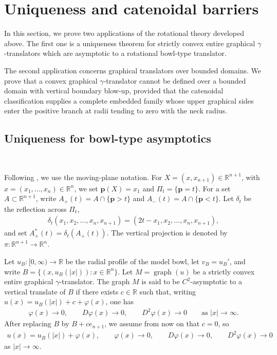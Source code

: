 \documentclass{amsart}
\theoremstyle{plain}
\theoremstyle{mainintrothm}
\theoremstyle{definition}
\begin{document}
	
	


\section{Uniqueness and catenoidal barriers}
	\label{sec:uniqueness-catenoidal-barriers}
	
	In this section, we prove two applications of the rotational theory developed above.
	The first one is a uniqueness theorem for strictly convex entire graphical
	$\gamma$-translators which are asymptotic to a rotational bowl-type translator.
	
	\medskip
	
	The second application concerns graphical translators over bounded domains.  We prove that a convex graphical $\gamma$-translator cannot be
	defined over a bounded domain with vertical boundary blow-up, provided that the
	catenoidal classification supplies a complete embedded family whose upper
	graphical sides enter the positive branch at radii tending to zero with the neck
	radius.  	
	\subsection{Uniqueness for bowl-type asymptotics}\,
	
	Following \cite{Paco_2014}, we use the moving-plane notation.  For
	$X=(x,x_{n+1})\in\mathbb R^{n+1}$, with
	$x=(x_1,\ldots,x_n)\in\mathbb R^n$, we set $\mathbf p(X)=x_1$ and
	$\Pi_t=\{\mathbf p=t\}$.  For a set $A\subset\mathbb R^{n+1}$, write
	$A_+(t)=A\cap\{\mathbf p>t\}$ and
	$A_-(t)=A\cap\{\mathbf p<t\}$.  Let $\delta_t$ be the reflection across
	$\Pi_t$,
	\begin{align*}
		\delta_t(x_1,x_2,\ldots,x_n,x_{n+1})
		=
		(2t-x_1,x_2,\ldots,x_n,x_{n+1}),
	\end{align*}
	and set $A_+^*(t)=\delta_t(A_+(t))$.  The vertical projection is denoted by
	$\pi:\mathbb R^{n+1}\to\mathbb R^n$.
	
	\medskip
	
	Let $u_B:[0,\infty)\to\mathbb R$ be the radial profile of the model bowl, let
	$v_B=u_B'$, and write $B=\{(x,u_B(|x|)):x\in\mathbb R^n\}$. Let $M=\operatorname{graph}(u)$ be a strictly convex entire graphical
	$\gamma$-translator.  The graph $M$ is said to be $C^2$-asymptotic to a vertical
	translate of $B$ if there exists $c\in\mathbb R$ such that, writing
	$u(x)=u_B(|x|)+c+\varphi(x)$, one has
	\begin{align*}
		\varphi(x)\to0,
		\qquad
		D\varphi(x)\to0,
		\qquad
		D^2\varphi(x)\to0
		\qquad
		\text{as }|x|\to\infty .
	\end{align*}
	After replacing $B$ by $B+c e_{n+1}$, we assume from now on that $c=0$, so
	\begin{align}
		\label{eq:C2-asymptotic-to-bowl}
		u(x)=u_B(|x|)+\varphi(x),
		\qquad
		\varphi(x)\to0,
		\qquad
		D\varphi(x)\to0,
		\qquad
		D^2\varphi(x)\to0
	\end{align}
	as $|x|\to\infty$.
	
\end{document}
